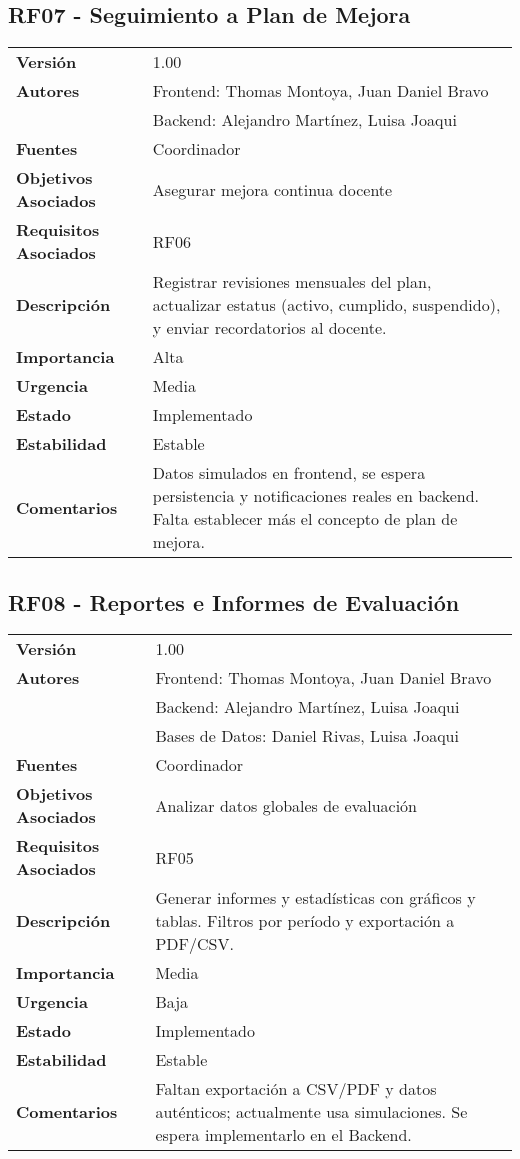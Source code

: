 \documentclass{article}
\begin{document}
\subsection*{RF07 - Seguimiento a Plan de Mejora}
\begin{longtable}{>{\bfseries}l p{}}
Versión & 1.00 \\
Autores & Frontend: Thomas Montoya, Juan Daniel Bravo \\ 
        & Backend: Alejandro Martínez, Luisa Joaqui \\
Fuentes & Coordinador \\
Objetivos Asociados & Asegurar mejora continua docente \\
Requisitos Asociados & RF06 \\
Descripción & Registrar revisiones mensuales del plan, actualizar estatus (activo, cumplido, suspendido), y enviar recordatorios al docente. \\
Importancia & Alta \\
Urgencia & Media \\
Estado & Implementado \\
Estabilidad & Estable \\
Comentarios & Datos simulados en frontend, se espera persistencia y notificaciones reales en backend. Falta establecer más el concepto de plan de mejora. \\
\end{longtable}

\subsection*{RF08 - Reportes e Informes de Evaluación}
\begin{longtable}{>{\bfseries}l p{}}
Versión & 1.00 \\
Autores & Frontend: Thomas Montoya, Juan Daniel Bravo \\ 
        & Backend: Alejandro Martínez, Luisa Joaqui \\ 
        & Bases de Datos: Daniel Rivas, Luisa Joaqui \\
Fuentes & Coordinador \\
Objetivos Asociados & Analizar datos globales de evaluación \\
Requisitos Asociados & RF05 \\
Descripción & Generar informes y estadísticas con gráficos y tablas. Filtros por período y exportación a PDF/CSV. \\
Importancia & Media \\
Urgencia & Baja \\
Estado & Implementado \\
Estabilidad & Estable \\
Comentarios & Faltan exportación a CSV/PDF y datos auténticos; actualmente usa simulaciones. Se espera implementarlo en el Backend. \\
\end{longtable}
\end{document}
